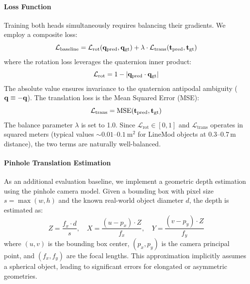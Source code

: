 \paragraph{Loss Function}
Training both heads simultaneously requires balancing their gradients. We employ a composite loss:
\begin{equation}
    \mathcal{L}_{\text{baseline}} = \mathcal{L}_{\text{rot}}(\mathbf{q}_{\text{pred}}, \mathbf{q}_{\text{gt}}) + \lambda \cdot \mathcal{L}_{\text{trans}}(\mathbf{t}_{\text{pred}}, \mathbf{t}_{\text{gt}})
    \label{eq:baseline_loss}
\end{equation}
where the rotation loss leverages the quaternion inner product:
\begin{equation}
    \mathcal{L}_{\text{rot}} = 1 - |\mathbf{q}_{\text{pred}} \cdot \mathbf{q}_{\text{gt}}|
    \label{eq:rot_loss}
\end{equation}
The absolute value ensures invariance to the quaternion antipodal ambiguity ($\mathbf{q} \equiv -\mathbf{q}$). The translation loss is the Mean Squared Error (MSE):
\begin{equation}
    \mathcal{L}_{\text{trans}} = \text{MSE}(\mathbf{t}_{\text{pred}}, \mathbf{t}_{\text{gt}})
    \label{eq:trans_loss}
\end{equation}
The balance parameter $\lambda$ is set to 1.0. Since $\mathcal{L}_{\text{rot}} \in [0, 1]$ and $\mathcal{L}_{\text{trans}}$ operates in squared meters (typical values $\sim 0.01$--$0.1~\text{m}^2$ for LineMod objects at 0.3--0.7\,m distance), the two terms are naturally well-balanced.

\paragraph{Pinhole Translation Estimation}
As an additional evaluation baseline, we implement a geometric depth estimation using the pinhole camera model. Given a bounding box with pixel size $s = \max(w, h)$ and the known real-world object diameter $d$, the depth is estimated as:
\begin{equation}
    Z = \frac{f_x \cdot d}{s}, \quad X = \frac{(u - p_x) \cdot Z}{f_x}, \quad Y = \frac{(v - p_y) \cdot Z}{f_y}
    \label{eq:pinhole}
\end{equation}
where $(u, v)$ is the bounding box center, $(p_x, p_y)$ is the camera principal point, and $(f_x, f_y)$ are the focal lengths. This approximation implicitly assumes a spherical object, leading to significant errors for elongated or asymmetric geometries.

